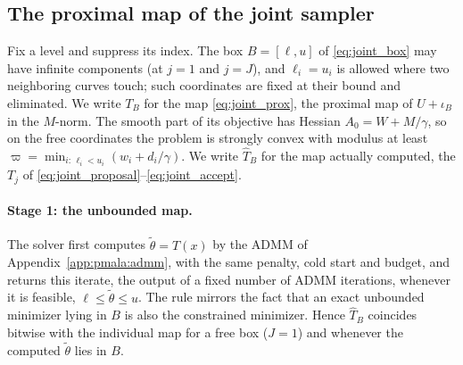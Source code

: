 \subsection{The proximal map of the joint sampler}
\label{app:pmala:boxsolver}

Fix a level and suppress its index. The box $B = [\ell, u]$ of \eqref{eq:joint_box} may have infinite components (at $j = 1$ and $j = J$), and $\ell_i = u_i$ is allowed where two neighboring curves touch; such coordinates are fixed at their bound and eliminated. We write $T_B$ for the map \eqref{eq:joint_prox}, the proximal map of $U + \iota_B$ in the $M$-norm. The smooth part of its objective has Hessian $A_0 = W + M/\gamma$, so on the free coordinates the problem is strongly convex with modulus at least $\varpi = \min_{i:\,\ell_i < u_i}(w_i + d_i/\gamma)$. We write $\widehat T_B$ for the map actually computed, the $T_j$ of \eqref{eq:joint_proposal}--\eqref{eq:joint_accept}.

\paragraph{Stage 1: the unbounded map.} The solver first computes $\tilde\theta = T(x)$ by the ADMM of Appendix~\ref{app:pmala:admm}, with the same penalty, cold start and budget, and returns this iterate, the output of a fixed number of ADMM iterations, whenever it is feasible, $\ell \le \tilde\theta \le u$. The rule mirrors the fact that an exact unbounded minimizer lying in $B$ is also the constrained minimizer. Hence $\widehat T_B$ coincides bitwise with the individual map for a free box ($J = 1$) and whenever the computed $\tilde\theta$ lies in $B$.

